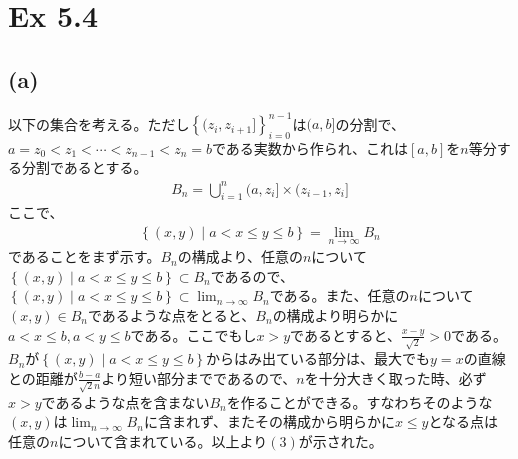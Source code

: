 \documentclass{article}
\begin{document}
\section{Ex 5.4}
\subsection{(a)}
以下の集合を考える。ただし$\left\{ (z_i ,z_{i+1}] \right\}_{i = 0}^{n-1}$は$(a, b]$の分割で、$a = z_0 < z_1 < \cdots < z_{n-1} < z_n = b$である実数から作られ、これは$[a,b]$を$n$等分する分割であるとする。
\begin{align*}
	B_n = \bigcup_{i = 1}^n (a, z_i] \times (z_{i-1}, z_i]
\end{align*}
ここで、
\begin{align}
	\left\{ (x, y) \mid a < x \leq y \leq b \right\} = \lim_{n\to \infty} B_n
\end{align}
であることをまず示す。$B_n$の構成より、任意の$n$について$\left\{ (x, y) \mid a < x \leq y \leq b \right\} \subset B_n$であるので、$\left\{ (x, y) \mid a < x \leq y \leq b \right\} \subset \lim_{n\to \infty} B_n$である。また、任意の$n$について$(x, y) \in B_n$であるような点をとると、$B_n$の構成より明らかに$a < x \leq b, a < y \leq b$である。ここでもし$x > y$であるとすると、$\frac{x-y}{\sqrt{2}} > 0$である。$B_n$が$\left\{ (x, y) \mid a < x \leq y \leq b \right\}$からはみ出ている部分は、最大でも$y = x$の直線との距離が$\frac{b-a}{\sqrt{2}n}$より短い部分までであるので、$n$を十分大きく取った時、必ず$x > y$であるような点を含まない$B_n$を作ることができる。すなわちそのような$(x, y)$は$\lim_{n\to \infty} B_n$に含まれず、またその構成から明らかに$x\leq y$となる点は任意の$n$について含まれている。以上より$(3)$が示された。
\end{document}

